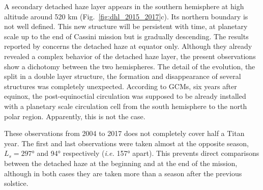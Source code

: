 A secondary detached haze layer appears in the southern hemisphere at high altitude around 520 km
(Fig.~\ref{fig:dhl_2015_2017}c). Its northern boundary is not well defined. This new structure will be persistent with
time, at planetary scale up to the end of Cassini mission but is gradually descending. The results reported by \cite{West2018}
concerns the detached haze at equator only. Although they already revealed a complex behavior of the detached haze layer, the
present observations show a dichotomy between the two hemispheres. The detail of the evolution, the split in a double layer
structure, the formation and disappearance of several structures was completely unexpected. According to GCMs, six years
after equinox, the post-equinoctial circulation was supposed to be already installed with a planetary scale circulation cell
from the south hemisphere to the north polar region. Apparently, this is not the case.

These observations from 2004 to 2017 does not completely cover half a Titan year. The first and last observations
were taken almost at the opposite season, $L_s=\ang{297}$ and \ang{94} respectively (\emph{i.e.} \ang{157} apart).
This prevents direct comparisons between the detached haze at the beginning and at the end of the mission,
although in both cases they are taken more than a season after the previous solstice.
